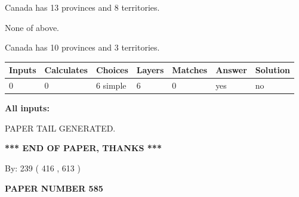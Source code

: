\documentclass[12pt]{article}
\begin{document}
 
Canada has  13 provinces and  8 territories.
 
 
 None of above.
 
 
\noindent{}
 
 
Canada has 10  provinces and 3 territories.
 
 
\noindent{}
 
 
   
   
   
   
\noindent\begin{tabular}{|l|l|l|l|l|l|l|}
 \hline
Inputs & Calculates & Choices & Layers & Matches & Answer & Solution \\ \hline
 0  & 
 0  & 
 6
  simple  
  & 
 6  & 
 0  & 
  yes & 
  no 
  \\ \hline
 \end{tabular}
   
   
   
   
\noindent{}
   
   
   
   
\noindent\vspace{0.1in}\hspace{-0.08in} {\textbf{\Large{All inputs: }}}
   
   
   
   
   
   
 \vspace{0.2in}
 
   
   
\vspace{2.0in} PAPER TAIL GENERATED.
   
   
   
   
\vspace{1.0in} 
{\textbf{\large{ *** END OF PAPER, THANKS *** }}} 
   
   
\hspace{1.0in} By: 
 239 ( 416 ,  613 )
   
   
   
   
\newpage 
\setcounter{page}{ 
   585001 } 
   
   
   
   
 {\textbf{ \Large{ PAPER NUMBER  585  }}}
   
\end{document}
